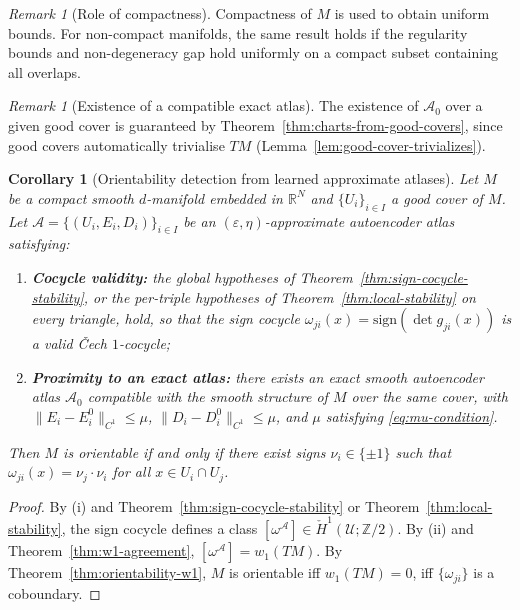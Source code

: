 \documentclass[11pt]{article}
\newcommand{\R}{\mathbb{R}}
\newcommand{\Z}{\mathbb{Z}}
\newcommand{\sign}{\mathrm{sign}}
\theoremstyle{plain}
\newtheorem{corollary}[theorem]{Corollary}
\theoremstyle{definition}
\theoremstyle{remark}
\newtheorem{remark}[theorem]{Remark}
\begin{document}
\begin{remark}[Role of compactness]
Compactness of $M$ is used to obtain uniform bounds. For non-compact manifolds, the same result holds if the regularity bounds and non-degeneracy gap hold uniformly on a compact subset containing all overlaps.
\end{remark}

\begin{remark}[Existence of a compatible exact atlas]
The existence of $\mathcal{A}_0$ over a given good cover is guaranteed by Theorem~\ref{thm:charts-from-good-covers}, since good covers automatically trivialise $TM$ (Lemma~\ref{lem:good-cover-trivializes}).
\end{remark}

\begin{corollary}[Orientability detection from learned approximate atlases]\label{cor:practical-orientability}
Let $M$ be a compact smooth $d$-manifold embedded in $\R^N$ and $\{U_i\}_{i \in I}$ a good cover of $M$. Let $\mathcal{A} = \{(U_i, E_i, D_i)\}_{i \in I}$ be an $(\varepsilon, \eta)$-approximate autoencoder atlas satisfying:
\begin{enumerate}[label=(\roman*)]
    \item \textbf{Cocycle validity:} the global hypotheses of Theorem~\ref{thm:sign-cocycle-stability}, or the per-triple hypotheses of Theorem~\ref{thm:local-stability} on every triangle, hold, so that the sign cocycle $\omega_{ji}(x) = \sign(\det g_{ji}(x))$ is a valid \v{C}ech $1$-cocycle;
    \item \textbf{Proximity to an exact atlas:} there exists an exact smooth autoencoder atlas $\mathcal{A}_0$ compatible with the smooth structure of $M$ over the same cover, with $\|E_i - E_i^0\|_{C^1} \leq \mu$, $\|D_i - D_i^0\|_{C^1} \leq \mu$, and $\mu$ satisfying \eqref{eq:mu-condition}.
\end{enumerate}
Then $M$ is orientable if and only if there exist signs $\nu_i \in \{\pm 1\}$ such that $\omega_{ji}(x) = \nu_j \cdot \nu_i$ for all $x \in U_i \cap U_j$.
\end{corollary}

\begin{proof}
By (i) and Theorem~\ref{thm:sign-cocycle-stability} or Theorem~\ref{thm:local-stability}, the sign cocycle defines a class $[\omega^{\mathcal{A}}] \in \check{H}^1(\mathcal{U}; \Z/2)$. By (ii) and Theorem~\ref{thm:w1-agreement}, $[\omega^{\mathcal{A}}] = w_1(TM)$. By Theorem~\ref{thm:orientability-w1}, $M$ is orientable iff $w_1(TM) = 0$, iff $\{\omega_{ji}\}$ is a coboundary.
\end{proof}
\end{document}
